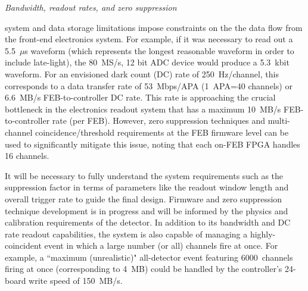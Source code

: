
 
\textit{\it Bandwidth, readout rates, and zero suppression}

 system and data storage limitations impose constraints on the the data flow from the front-end electronics system. 
For example, if it was necessary to read out a 5.5~$\mu$s waveform (which represents the longest reasonable waveform 
in order to include late-light), the 80~MS/s, 12 bit ADC device would produce a 5.3~kbit waveform. For an envisioned dark count (DC) rate of 250~Hz/channel, this corresponds to a data transfer rate of 53~Mbps/APA (1~APA=40 channels) or 6.6~MB/s FEB-to-controller DC rate. This rate is approaching the crucial bottleneck in the electronics readout system that has a maximum 10~MB/s FEB-to-controller rate (per FEB). However, zero suppression techniques and multi-channel coincidence/threshold requirements at the FEB firmware level can be used to significantly mitigate this issue, noting that each on-FEB FPGA handles 16 channels. 

It will be necessary to fully understand the system requirements such as the suppression factor in terms of parameters like the readout window length and overall trigger rate to guide the final design. 
Firmware and zero suppression technique development is in progress and will be informed by the physics and calibration requirements of the detector. 
In addition to its bandwidth and DC rate readout capabilities, the system is also capable of managing a highly-coincident event in which a large number (or all) channels fire at once. For example, a ``maximum (unrealistic)" all-detector event featuring 6000~channels firing at once (corresponding to 4~MB) could be handled by the controller's 24-board write speed of 150~MB/s. 

